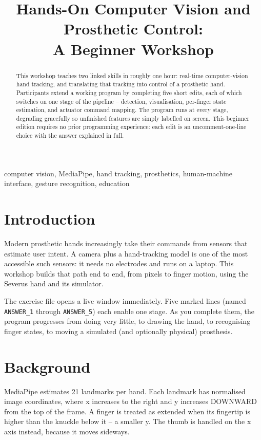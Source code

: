 \documentclass[conference]{IEEEtran}
\begin{document}
\title{Hands-On Computer Vision and Prosthetic Control:\\ A Beginner Workshop}
\author{
}
\maketitle

\begin{abstract}
This workshop teaches two linked skills in roughly one hour: real-time computer-vision hand tracking, and translating that tracking into control of a prosthetic hand. Participants extend a working program by completing five short edits, each of which switches on one stage of the pipeline -- detection, visualisation, per-finger state estimation, and actuator command mapping. The program runs at every stage, degrading gracefully so unfinished features are simply labelled on screen. This beginner edition requires no prior programming experience: each edit is an uncomment-one-line choice with the answer explained in full.
\end{abstract}

\begin{IEEEkeywords}
computer vision, MediaPipe, hand tracking, prosthetics, human-machine interface, gesture recognition, education
\end{IEEEkeywords}

\section{Introduction}
Modern prosthetic hands increasingly take their commands from sensors that estimate user intent. A camera plus a hand-tracking model is one of the most accessible such sensors: it needs no electrodes and runs on a laptop. This workshop builds that path end to end, from pixels to finger motion, using the Severus hand and its simulator.

The exercise file opens a live window immediately. Five marked lines (named \lstinline!ANSWER_1! through \lstinline!ANSWER_5!) each enable one stage. As you complete them, the program progresses from doing very little, to drawing the hand, to recognising finger states, to moving a simulated (and optionally physical) prosthesis.

\section{Background}
MediaPipe estimates 21 landmarks per hand. Each landmark has normalised image coordinates, where x increases to the right and y increases DOWNWARD from the top of the frame. A finger is treated as extended when its fingertip is higher than the knuckle below it -- a smaller y. The thumb is handled on the x axis instead, because it moves sideways.
\end{document}
